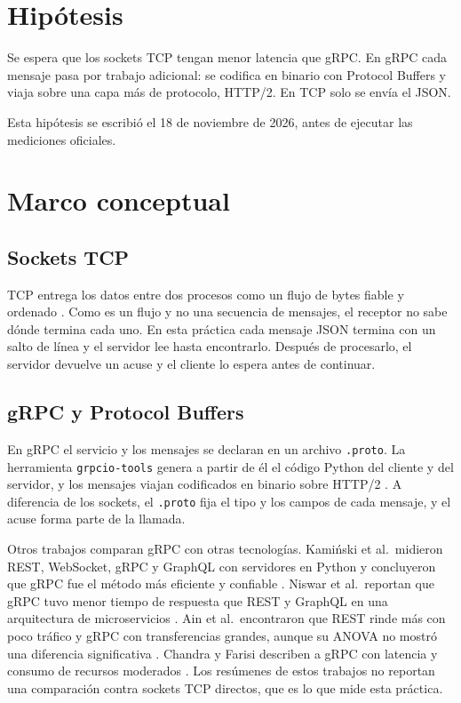 \documentclass[11pt,a4paper]{article}
\begin{document}
\section{Hipótesis}

Se espera que los sockets TCP tengan menor latencia que gRPC. En gRPC cada mensaje pasa
por trabajo adicional: se codifica en binario con Protocol Buffers y viaja sobre una capa
más de protocolo, HTTP/2. En TCP solo se envía el JSON.

Esta hipótesis se escribió el 18 de noviembre de 2026, antes de ejecutar las mediciones
oficiales.

\section{Marco conceptual}

\subsection{Sockets TCP}

TCP entrega los datos entre dos procesos como un flujo de bytes fiable y ordenado
\cite{eddy2022}. Como es un flujo y no una secuencia de mensajes, el receptor no sabe
dónde termina cada uno. En esta práctica cada mensaje JSON termina con un salto de línea
y el servidor lee hasta encontrarlo. Después de procesarlo, el servidor devuelve un
acuse y el cliente lo espera antes de continuar.

\subsection{gRPC y Protocol Buffers}

En gRPC el servicio y los mensajes se declaran en un archivo \texttt{.proto}. La
herramienta \texttt{grpcio-tools} genera a partir de él el código Python del cliente y
del servidor, y los mensajes viajan codificados en binario sobre HTTP/2 \cite{ain2025}.
A diferencia de los sockets, el \texttt{.proto} fija el tipo y los campos de cada
mensaje, y el acuse forma parte de la llamada.

Otros trabajos comparan gRPC con otras tecnologías. Kamiński et al.\ midieron REST,
WebSocket, gRPC y GraphQL con servidores en Python y concluyeron que gRPC fue el método
más eficiente y confiable \cite{kaminski2023}. Niswar et al.\ reportan que gRPC tuvo
menor tiempo de respuesta que REST y GraphQL en una arquitectura de microservicios
\cite{niswar2024}. Ain et al.\ encontraron que REST rinde más con poco tráfico y gRPC con
transferencias grandes, aunque su ANOVA no mostró una diferencia significativa
\cite{ain2025}. Chandra y Farisi describen a gRPC con latencia y consumo de recursos
moderados \cite{chandra2025}. Los resúmenes de estos trabajos no reportan una comparación
contra sockets TCP directos, que es lo que mide esta práctica.
\end{document}
